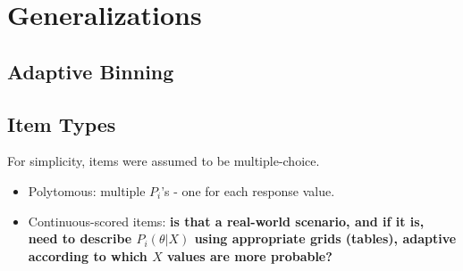 \documentclass{article}
\begin{document}
\section{Generalizations}

\subsection{Adaptive Binning}
\label{adaptive_grid}

\subsection{Item Types}
For simplicity, items were assumed to be multiple-choice.
\begin{itemize}
	\item Polytomous: multiple $P_i$'s - one for each response value.
	\item Continuous-scored items: {\bf is that a real-world scenario, and if it is, need to describe $P_i(\theta|X)$
	using appropriate grids (tables), adaptive according to which $X$ values are more probable?}
\end{itemize}



\end{document}
